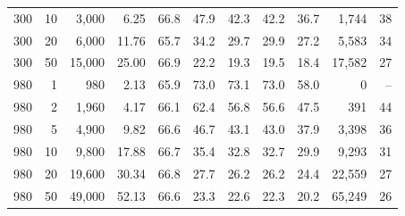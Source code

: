 {\begin{tabular}{@{}rrrr|ccccc|rr@{}}
300 & 10 & 3,000 & 6.25 & 66.8 & 47.9 & 42.3 & 42.2 & 36.7 & 1,744 & 38 \\
300 & 20 & 6,000 & 11.76 & 65.7 & 34.2 & 29.7 & 29.9 & 27.2 & 5,583 & 34 \\
300 & 50 & 15,000 & 25.00 & 66.9 & 22.2 & 19.3 & 19.5 & 18.4 & 17,582 & 27 \\
980 & 1 & 980 & 2.13 & 65.9 & 73.0 & 73.1 & 73.0 & 58.0 & 0 & -- \\
980 & 2 & 1,960 & 4.17 & 66.1 & 62.4 & 56.8 & 56.6 & 47.5 & 391 & 44 \\
980 & 5 & 4,900 & 9.82 & 66.6 & 46.7 & 43.1 & 43.0 & 37.9 & 3,398 & 36 \\
980 & 10 & 9,800 & 17.88 & 66.7 & 35.4 & 32.8 & 32.7 & 29.9 & 9,293 & 31 \\
980 & 20 & 19,600 & 30.34 & 66.8 & 27.7 & 26.2 & 26.2 & 24.4 & 22,559 & 27 \\
980 & 50 & 49,000 & 52.13 & 66.6 & 23.3 & 22.6 & 22.3 & 20.2 & 65,249 & 26 \\
\hline
\end{tabular}}%
